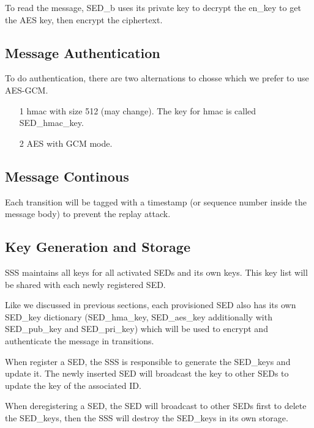 \documentclass[11pt,oneside,onecolumn,letterpaper]{article}
\begin{document}
To read the message, SED\_b uses its private key to decrypt the en\_key to get the AES key, then encrypt the ciphertext. 

\subsection{Message Authentication}
To do authentication, there are two alternations to chosse which we prefer to use AES-GCM.
\begin{itemize}
  \item[1] hmac with size 512 (may change).
  The key for hmac is called SED\_hmac\_key.
  \item[2] AES with GCM mode.
\end{itemize}

\subsection{Message Continous}
Each transition will be tagged with a timestamp (or sequence number inside the message body) to prevent the replay attack.

\subsection{Key Generation and Storage}
SSS maintains all keys for all activated SEDs and its own keys.
This key list will be shared with each newly registered SED.

Like we discussed in previous sections, each provisioned SED also has its own SED\_key dictionary (SED\_hma\_key, SED\_aes\_key additionally with SED\_pub\_key and SED\_pri\_key) which will be used to encrypt and authenticate the message in transitions.

When register a SED, the SSS is responsible to generate the SED\_keys and update it.
The newly inserted SED will broadcast the key to other SEDs to update the key of the associated ID.

When deregistering a SED, the SED will broadcast to other SEDs first to delete the SED\_keys, then the SSS will destroy the SED\_keys in its own storage.
\end{document}
